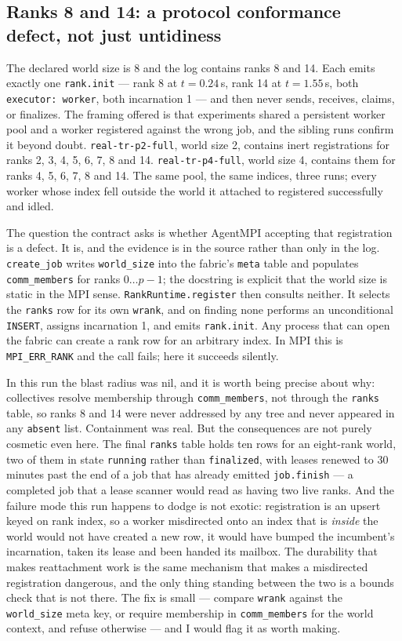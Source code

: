\documentclass[11pt]{article}
\begin{document}
\subsection*{Ranks 8 and 14: a protocol conformance defect, not just untidiness}

The declared world size is 8 and the log contains ranks 8 and 14. Each emits exactly one
\texttt{rank.init} --- rank 8 at $t=0.24$\,s, rank 14 at $t=1.55$\,s, both
\texttt{executor: worker}, both incarnation 1 --- and then never sends, receives, claims,
or finalizes. The framing offered is that experiments shared a persistent worker pool and a
worker registered against the wrong job, and the sibling runs confirm it beyond doubt.
\texttt{real-tr-p2-full}, world size 2, contains inert registrations for ranks 2, 3, 4, 5,
6, 7, 8 and 14. \texttt{real-tr-p4-full}, world size 4, contains them for ranks 4, 5, 6, 7,
8 and 14. The same pool, the same indices, three runs; every worker whose index fell
outside the world it attached to registered successfully and idled.

The question the contract asks is whether AgentMPI accepting that registration is a defect.
It is, and the evidence is in the source rather than only in the log.
\texttt{create\_job} writes \texttt{world\_size} into the fabric's \texttt{meta} table and
populates \texttt{comm\_members} for ranks $0\ldots p-1$; the docstring is explicit that the
world size is static in the MPI sense. \texttt{RankRuntime.register} then consults neither.
It selects the \texttt{ranks} row for its own \texttt{wrank}, and on finding none performs
an unconditional \texttt{INSERT}, assigns incarnation 1, and emits \texttt{rank.init}. Any
process that can open the fabric can create a rank row for an arbitrary index. In MPI this
is \texttt{MPI\_ERR\_RANK} and the call fails; here it succeeds silently.

In this run the blast radius was nil, and it is worth being precise about why: collectives
resolve membership through \texttt{comm\_members}, not through the \texttt{ranks} table, so
ranks 8 and 14 were never addressed by any tree and never appeared in any \texttt{absent}
list. Containment was real. But the consequences are not purely cosmetic even here. The
final \texttt{ranks} table holds ten rows for an eight-rank world, two of them in state
\texttt{running} rather than \texttt{finalized}, with leases renewed to 30 minutes past the
end of a job that has already emitted \texttt{job.finish} --- a completed job that a lease
scanner would read as having two live ranks. And the failure mode this run happens to dodge
is not exotic: registration is an upsert keyed on rank index, so a worker misdirected onto
an index that is \emph{inside} the world would not have created a new row, it would have
bumped the incumbent's incarnation, taken its lease and been handed its mailbox. The
durability that makes reattachment work is the same mechanism that makes a misdirected
registration dangerous, and the only thing standing between the two is a bounds check that
is not there. The fix is small --- compare \texttt{wrank} against the \texttt{world\_size}
meta key, or require membership in \texttt{comm\_members} for the world context, and refuse
otherwise --- and I would flag it as worth making.
\end{document}
